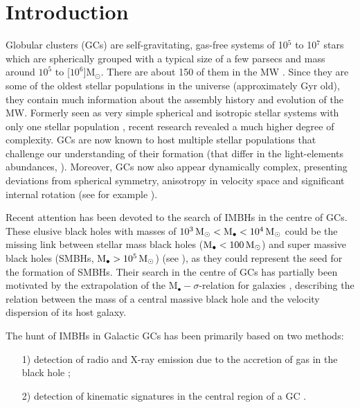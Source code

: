 

\section{Introduction}\label{sec:Introduction}
Globular clusters (\acsp{GC}) are self-gravitating, gas-free systems of 10\(^5\) to 10\(^7\) stars which are spherically grouped with a typical size of a few parsecs and mass around $10^5$ to \unit[$10^6$]{M$_\odot$}. There are about 150 of them in the \ac{MW} \citep{1996AJ....112.1487H}. Since they are some of the oldest stellar populations in the universe (approximately \unit[13]{Gyr} old), they contain much information about the assembly history and evolution of the \ac{MW}. Formerly seen as very simple spherical and isotropic stellar systems with only one stellar population \citep{1997A&ARv...8....1M}, recent research revealed a much higher degree of complexity. \acp{GC} are now known to host multiple stellar populations that challenge our understanding of their formation (that differ in the light-elements abundances, \citealp{2015AJ....149...91P}). Moreover, \acp{GC} now also appear dynamically complex, presenting deviations from spherical symmetry, anisotropy in velocity space and significant internal rotation (see for example \citealp{2012A&A...539A..65Z,2013ApJ...772...67B,2014A&A...567A..69K}).
\par Recent attention has been devoted to the search of \acfp{IMBH} in the centre of \acp{GC}. These elusive black holes with masses of \(\unit[10^3]{\mathrm{M}_\odot} < \mathrm{M}_\bullet < \unit[10^4]{\mathrm{M}_\odot}\) could be the missing link between stellar mass black holes (\(\mathrm{M}_\bullet < \unit[100]{\mathrm{M}_\odot}\)) and super massive black holes (\acsp{SMBH}, \(\mathrm{M}_\bullet > \unit[10^5]{\mathrm{M}_\odot}\))  (see \citealt[p.639]{2006ima..book.....C}), as they could represent the seed for the formation of \acp{SMBH}. Their search in the centre of \acp{GC} has partially been motivated by the extrapolation of the \(\mathrm{M}_\bullet-\sigma\)-relation for galaxies \citep{2000ApJ...539L...9F}, describing the relation between the mass of a central massive black hole and the velocity dispersion of its host galaxy.
\par The hunt of \acp{IMBH} in Galactic \acp{GC} has been primarily based on two methods: 
\begin{itemize}
\item[1)] detection of radio and X-ray emission due to the accretion of gas in the black hole \citep{2002MNRAS.330..232C,2008MNRAS.389..379M,2012A&A...542A..44K,2012ApJ...750L..27S}; 
\item[2)] detection of kinematic signatures in the central region of a \ac{GC} \citep{1976ApJ...209..214B,2013A&A...552A..49L}.
\end{itemize} 
